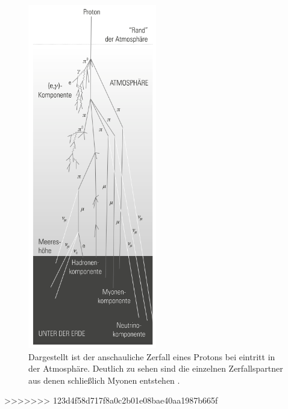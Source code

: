 \begin{figure}
    \centering
    \includegraphics[width=0.5\textwidth]{bilder/zerfall.png}
    \caption{Dargestellt ist der anschauliche Zerfall eines Protons bei eintritt in der Atmosphäre. 
            Deutlich zu sehen sind die einzelnen Zerfallspartner aus denen schließlich Myonen entstehen \cite{einfuehrung}.}
    \label{ehhnicht}
\end{figure}


>>>>>>> 123d4f58d717f8a0c2b01e08bae40aa1987b665f

